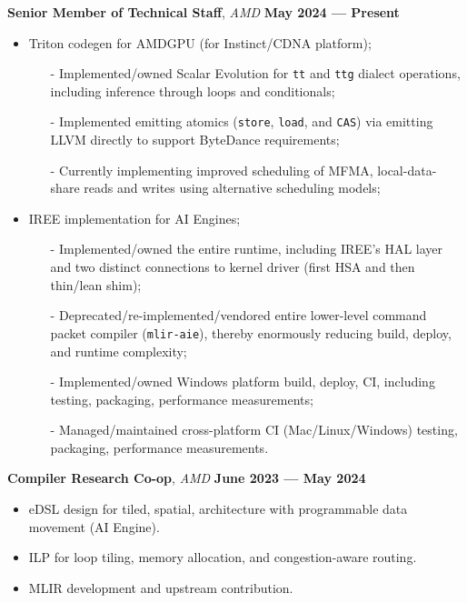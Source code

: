 \documentclass[11pt,letterpaper,roman,colorlinks,linkcolor=blue]{moderncv}
\begin{document}
\textbf{Senior Member of Technical Staff}, \emph{AMD}
\hfill \textbf{May 2024 --- Present}
\begin{itemize}
\item Triton codegen for AMDGPU (for Instinct/CDNA platform);
    \begin{itemize}
      \item[-]{\small Implemented/owned Scalar Evolution for \texttt{tt} and \texttt{ttg} dialect operations, including inference through loops and conditionals;}
      \item[-]{\small Implemented emitting atomics (\texttt{store}, \texttt{load}, and \texttt{CAS}) via emitting LLVM directly to support ByteDance requirements;}
      \item[-]{\small Currently implementing improved scheduling of MFMA, local-data-share reads and writes using alternative scheduling models;}
    \end{itemize}
\item IREE implementation for AI Engines;
    \begin{itemize}
      \item[-]{\small Implemented/owned the entire runtime, including IREE's HAL layer and two distinct connections to kernel driver (first HSA and then thin/lean shim);}
      \item[-]{\small Deprecated/re-implemented/vendored entire lower-level command packet compiler (\texttt{mlir-aie}), thereby enormously reducing build, deploy, and runtime complexity;}
      \item[-]{\small Implemented/owned Windows platform build, deploy, CI, including testing, packaging, performance measurements;}
      \item[-]{\small Managed/maintained cross-platform CI (Mac/Linux/Windows) testing, packaging, performance measurements.}
    \end{itemize}
\end{itemize}

\textbf{Compiler Research Co-op}, \emph{AMD}
\hfill \textbf{June 2023 --- May 2024}
\begin{itemize}
\item eDSL design for tiled, spatial, architecture with programmable data movement (AI Engine).
\item ILP for loop tiling, memory allocation, and congestion-aware routing.
\item MLIR development and upstream contribution.
\end{itemize}
\end{document}
